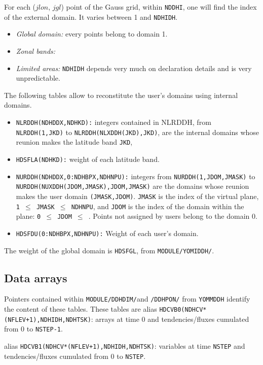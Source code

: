 For each ($jlon$, $jgl$) point of the Gauss grid, within {\tt NDDHI}, one will find the index of the external domain. It varies between 1 and {\tt NDHIDH}.
\begin{itemize}
\item {\sl Global domain:}  every points belong to domain 1.
\item {\sl Zonal bands:} 
\item {\sl Limited areas:} {\tt NDHIDH} depends very much on declaration details and is very unpredictable. 
\end{itemize}
The following tables allow to reconstitute the user's domains using internal domains.
\begin{itemize}
\item {\tt NLRDDH(NDHDDX,NDHKD):} integers contained in NLRDDH, from {\tt NLRDDH(1,JKD)} to {\tt NLRDDH(NLXDDH(JKD),JKD)}, are the internal domains whose reunion makes the latitude band {\tt JKD},
\item {\tt HDSFLA(NDHKD):} weight of each latitude band.
\item {\tt NURDDH(NDHDDX,0:NDHBPX,NDHNPU):} integers from {\tt NURDDH(1,JDOM,JMASK)} to {\tt NURDDH(NUXDDH(JDOM,JMASK),JDOM,JMASK)} are the domains whose reunion makes  the user domain {\tt (JMASK,JDOM)}. {\tt JMASK} is the index of the virtual plane, {\tt 1 $\leq$ JMASK $\leq$ NDHNPU}, and {\tt JDOM} is the index of the domain within the plane: {\tt 0 $\leq$ JDOM $\leq$ }. Points not assigned by users belong to the domain 0.
\item {\tt HDSFDU(0:NDHBPX,NDHNPU):} Weight of each user's domain.
\end{itemize}

The weight of the global domain is {\tt HDSFGL}, from {\tt MODULE/YOMIDDH/}.
\subsection{Data arrays}

Pointers contained within {\tt MODULE/DDHDIM/}and   {\tt /DDHPON/} from {\tt YOMMDDH} identify the content of these tables. 
These tables are
 alias {\tt HDCVB0(NDHCV*(NFLEV+1),NDHIDH,NDHTSK)}: arrays at time 0 and tendencies/fluxes cumulated from 0 to {\tt NSTEP-1}.

 alias {\tt HDCVB1(NDHCV*(NFLEV+1),NDHIDH,NDHTSK)}: variables 
at time {\tt NSTEP} and tendencies/fluxes cumulated from 0 to {\tt NSTEP}.

